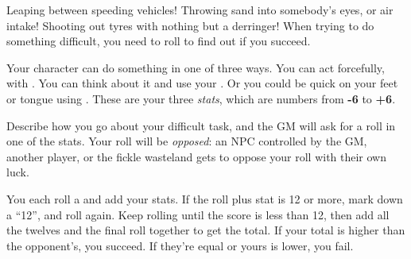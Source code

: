 
Leaping between speeding vehicles! Throwing sand into somebody's eyes, or air intake! Shooting out tyres with nothing but a derringer! When trying to do something difficult, you need to roll to find out if you succeed.

Your character can do something in one of three ways. You can act forcefully, with . You can think about it and use your . Or you could be quick on your feet or tongue using . These are your three \emph{stats}, which are numbers from \textbf{-6} to \textbf{+6}.

Describe how you go about your difficult task, and the GM will ask for a roll in one of the stats. Your roll will be \emph{opposed}: an NPC controlled by the GM, another player, or the fickle wasteland gets to oppose your roll with their own luck.

You each roll a  and add your stats. If the roll plus stat is 12 or more, mark down a ``12'', and roll again. Keep rolling until the score is less than 12, then add all the twelves and the final roll together to get the total. If your total is higher than the opponent's, you succeed. If they're equal or yours is lower, you fail.
